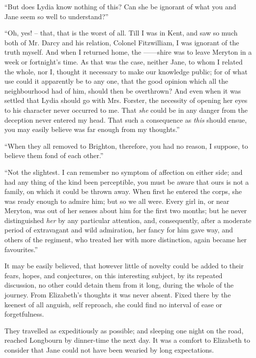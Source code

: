“But does Lydia know nothing of this? Can she be
ignorant of what you and Jane seem so well to
understand?”

“Oh, yes! -- that, that is the worst of all. Till I was
in Kent, and saw so much both of Mr. Darcy and his
relation, Colonel Fitzwilliam, I was ignorant of the truth
myself. And when I returned home, the ------shire was
to leave Meryton in a week or fortnight’s time. As that
was the case, neither Jane, to whom I related the whole,
nor I, thought it necessary to make our knowledge public;
for of what use could it apparently be to any one, that
the good opinion which all the neighbourhood had of
him, should then be overthrown? And even when it was
settled that Lydia should go with Mrs. Forster, the necessity
of opening her eyes to his character never occurred
to me. That \textit{she} could be in any danger from the deception
never entered my head. That such a consequence as \textit{this}
should ensue, you may easily believe was far enough from
my thoughts.”

“When they all removed to Brighton, therefore, you
had no reason, I suppose, to believe them fond of each
other.”

“Not the slightest. I can remember no symptom of
affection on either side; and had any thing of the kind
been perceptible, you must be aware that ours is not a
family, on which it could be thrown away. When first
he entered the corps, she was ready enough to admire
him; but so we all were. Every girl in, or near Meryton,
was out of her senses about him for the first two months;
but he never distinguished \textit{her} by any particular attention,
and, consequently, after a moderate period of extravagant
and wild admiration, her fancy for him gave way, and others
of the regiment, who treated her with more distinction,
again became her favourites.”

\strut

It may be easily believed, that however little of novelty
could be added to their fears, hopes, and conjectures, on
this interesting subject, by its repeated discussion, no
other could detain them from it long, during the whole
of the journey. From Elizabeth’s thoughts it was never
absent. Fixed there by the keenest of all anguish, self
reproach, she could find no interval of ease or
forgetfulness.

They travelled as expeditiously as possible; and sleeping
one night on the road, reached Longbourn by dinner-time
the next day. It was a comfort to Elizabeth to consider
that Jane could not have been wearied by long
expectations.

